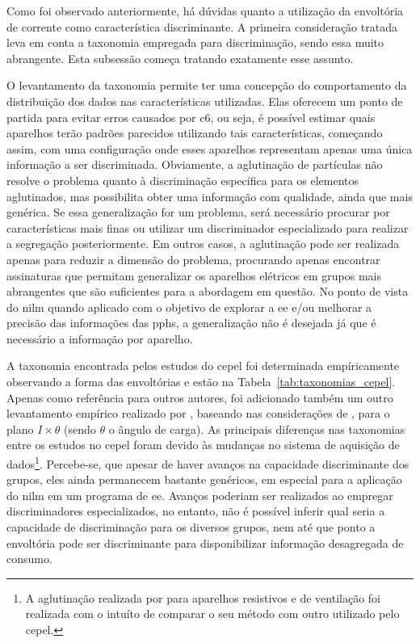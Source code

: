 Como foi observado anteriormente, há dúvidas quanto a utilização da
envoltória de corrente como característica discriminante. A primeira
consideração tratada leva em conta a taxonomia empregada para
discriminação, sendo essa muito abrangente. Esta subsessão começa
tratando exatamente esse assunto.

O levantamento da taxonomia permite ter uma concepção do comportamento
da distribuição dos dados nas características utilizadas. Elas
oferecem um ponto de partida para evitar erros causados por \gls{c6},
ou seja, é possível estimar quais aparelhos terão padrões parecidos
utilizando tais características, começando assim, com uma configuração
onde esses aparelhos representam apenas uma única informação a ser
discriminada. Obviamente, a aglutinação de partículas não resolve o
problema quanto à discriminação específica para os elementos
aglutinados, mas possibilita obter uma informação com qualidade, ainda
que mais genérica. Se essa generalização for um problema, será
necessário procurar por características mais finas ou utilizar um
discriminador especializado para realizar a segregação posteriormente.
Em outros casos, a aglutinação pode ser realizada apenas para reduzir
a dimensão do problema, procurando apenas encontrar assinaturas que
permitam generalizar os aparelhos elétricos em grupos mais
abrangentes que são suficientes para a abordagem em questão. No ponto
de vista do \gls{nilm} quando aplicado com o objetivo de explorar a
\gls{ee} e/ou melhorar a precisão das informações das \glspl{pph}, a
generalização não é desejada já que é necessário a informação por
aparelho.

A taxonomia encontrada pelos estudos do \gls{cepel}
foi determinada empíricamente observando a forma das envoltórias e
estão na Tabela~\ref{tab:taxonomias_cepel}. Apenas como referência
para outros autores, foi adicionado também um outro levantamento
empírico realizado por \citet*{nilm_cepel_aguiar}, baseando nas
considerações de \cite{nilm_sultanem_1991_10}, para o plano
$I\times\theta$ (sendo $\theta$ o ângulo de carga). As principais
diferenças nas taxonomias entre os estudos no \gls{cepel} foram devido
às mudanças no sistema de aquisição de dados\footnote{A aglutinação
realizada por \citeauthor*{nilm_cepel_bezerra} para aparelhos
resistivos e de ventilação foi realizada com o intuíto de comparar o
seu método com outro utilizado pelo \gls{cepel}.}. Percebe-se, que
apesar de haver avanços na capacidade discriminante dos grupos, eles
ainda permanecem bastante genéricos, em especial para a aplicação do
\gls{nilm} em um programa de \gls{ee}. Avanços poderiam ser realizados
ao empregar discriminadores especializados, no entanto, não é possível
inferir qual seria a capacidade de discriminação para os diversos
grupos, nem até que ponto a envoltória pode ser discriminante para
disponibilizar informação desagregada de consumo.

